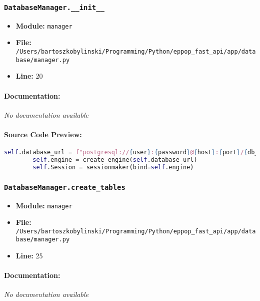 \documentclass[11pt,a4paper]{article}
\begin{document}
\vspace{1em}
\subsubsection{\texttt{DatabaseManager.\_\_init\_\_}}

\begin{itemize}
    \item \textbf{Module:} \texttt{manager}
    \item \textbf{File:} \texttt{/Users/bartoszkobylinski/Programming/Python/eppop\_fast\_api/app/database/manager.py}
    \item \textbf{Line:} 20
\end{itemize}

\paragraph{Documentation:} \textit{No documentation available}

\paragraph{Source Code Preview:}
\begin{lstlisting}[language=Python]
        self.database_url = f"postgresql://{user}:{password}@{host}:{port}/{db_name}"
        self.engine = create_engine(self.database_url)
        self.Session = sessionmaker(bind=self.engine)
\end{lstlisting}

\vspace{1em}
\subsubsection{\texttt{DatabaseManager.create\_tables}}

\begin{itemize}
    \item \textbf{Module:} \texttt{manager}
    \item \textbf{File:} \texttt{/Users/bartoszkobylinski/Programming/Python/eppop\_fast\_api/app/database/manager.py}
    \item \textbf{Line:} 25
\end{itemize}

\paragraph{Documentation:} \textit{No documentation available}
\end{document}
